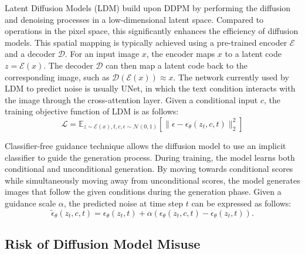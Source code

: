 Latent Diffusion Models (LDM) \cite{rombach2022high} build upon DDPM by performing the diffusion and denoising processes in a low-dimensional latent space. Compared to operations in the pixel space, this significantly enhances the efficiency of diffusion models.   This spatial mapping is typically achieved using a pre-trained encoder $\mathcal{E}$ and a decoder $\mathcal{D}$. For an input image $x$, the encoder maps $x$ to a latent code $z = \mathcal{E}(x)$. The decoder $\mathcal{D}$ can then map a latent code back to the corresponding image, such as $\mathcal{D}(\mathcal{E}(x))\approx x$. 
The network currently used by LDM to predict noise is usually UNet, in which the text condition interacts with the image through the cross-attention layer. 
Given a conditional input $c$, the training objective function of LDM is as follows:  
\begin{equation}
    \mathcal{L}=\mathbb{E}_{z\sim\mathcal{E}(x),t,c,\epsilon\sim\mathcal{N}(0,1)}\left[\|\epsilon-\epsilon_\theta(z_t,c,t)\|_2^2\right]
\end{equation}


Classifier-free guidance technique \cite{ho2022classifier} allows the diffusion model to use an implicit classifier to guide the generation process. During training, the model learns both conditional and unconditional generation. By moving towards conditional scores while simultaneously moving away from unconditional scores, the model generates images that follow the given conditions during the generation phase. Given a guidance scale $\alpha$, the predicted noise at time step $t$ can be expressed as follows:  
\begin{equation}
\tilde{\epsilon}_\theta(z_t,c,t)=\epsilon_\theta(z_t,t)+\alpha(\epsilon_\theta(z_t,c,t)-\epsilon_\theta(z_t,t)).
\end{equation}



\subsection{Risk of Diffusion Model Misuse}

